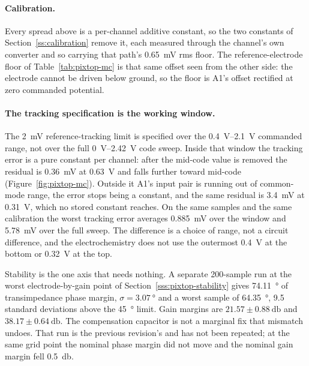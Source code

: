\paragraph{Calibration.} Every spread above is a per-channel additive constant,
so the two constants of Section~\ref{ss:calibration} remove it, each measured
through the channel's own converter and so carrying that path's
\SI{0.65}{\milli\volt} rms floor. The reference-electrode floor of
Table~\ref{tab:pixtop-mc} is that same offset seen from the other side: the
electrode cannot be driven below ground, so the floor is A1's offset rectified
at zero commanded potential.

\paragraph{The tracking specification is the working window.} The
\SI{2}{\milli\volt} reference-tracking limit is specified over the
\SIrange{0.4}{2.1}{\volt} commanded range, not over the full
\SIrange{0}{2.42}{\volt} code sweep. Inside that window the tracking error is a
pure constant per channel: after the mid-code value is removed the residual is
\SI{0.36}{\milli\volt} at \SI{0.63}{\volt} and falls further toward mid-code
(Figure~\ref{fig:pixtop-mc}). Outside it A1's input pair is running out of
common-mode range, the error stops being a constant, and the same residual is
\SI{3.4}{\milli\volt} at \SI{0.31}{\volt}, which no stored constant reaches.
On the same samples and the same calibration the worst tracking error averages
\SI{0.885}{\milli\volt} over the window and \SI{5.78}{\milli\volt} over the
full sweep. The difference is a choice of range, not a circuit difference, and
the electrochemistry does not use the outermost \SI{0.4}{\volt} at the bottom or
\SI{0.32}{\volt} at the top.

Stability is the one axis that needs nothing. A separate 200-sample run at the
worst electrode-by-gain point of Section~\ref{sss:pixtop-stability} gives
\SI{74.11}{\degree} of transimpedance phase margin,
\(\sigma = \SI{3.07}{\degree}\) and a worst sample of \SI{64.35}{\degree},
\num{9.5} standard deviations above the \SI{45}{\degree} limit. Gain margins are
\(21.57 \pm \SI{0.88}{\decibel}\) and \(38.17 \pm \SI{0.64}{\decibel}\). The
compensation capacitor is not a marginal fix that mismatch undoes. That run is
the previous revision's and has not been repeated; at the same grid point the
nominal phase margin did not move and the nominal gain margin fell
\SI{0.5}{\decibel}.
